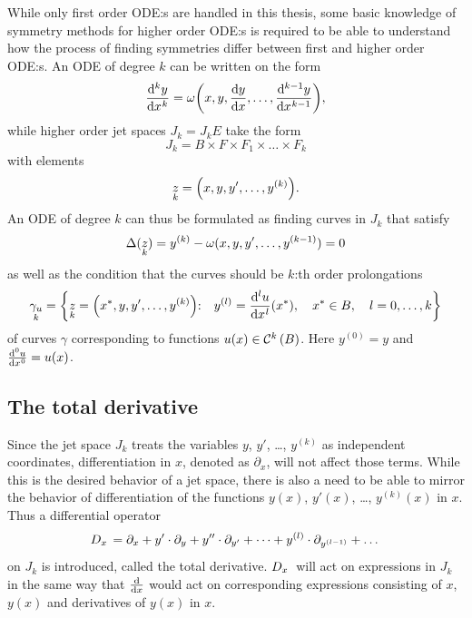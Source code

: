While only first order ODE:s are handled in this thesis, some basic knowledge of symmetry methods for higher order ODE:s is required to be able to understand how the process of finding symmetries differ between first and higher order ODE:s.
An ODE of degree \(k\) can be written on the form
\begin{equation}
  \diff[k]{y}{x} = \omega\qty(x, y, \diff{y}{x}, \dots, \diff[k-1]{y}{x}),
\end{equation}
while higher order jet spaces \(J_k = J_k E\) take the form
\begin{equation}
  J_k = B \times F \times F_1 \times \dots \times F_k
\end{equation}
with elements
\begin{equation}
  \prolong{z}{k} = \qty(x, y, y', \dots, y^{(k)}).
\end{equation}
An ODE of degree \(k\) can thus be formulated as finding curves in \(J_k\) that satisfy
\begin{equation}
  \Delta(\prolong{z}{k}) = y^{(k)} - \omega(x, y, y', \dots, y^{(k-1)}) = 0
\end{equation}
as well as the condition that the curves should be \(k\):th order prolongations
\begin{equation}
  \prolong{\gamma_u}{k} = \qty{\prolong{z}{k} = \qty(\fixed{x}, y, y', \dots, y^{(k)})\qq*{:} y^{(l)} = \diff[l]{u}{x}{(\fixed{x})}\qc \fixed{x} \in B\qc l = 0, \dots, k}
\end{equation}
of curves \(\gamma\) corresponding to functions \(u(x) \in \cont{k}{B}\).
Here \(y^{(0)} = y\) and \(\diff[0]{u}{x} = u(x)\).

\subsection{The total derivative}

Since the jet space \(J_k\) treats the variables \(y\), \(y'\), \dots, \(y^{(k)}\) as independent coordinates, differentiation in \(x\), denoted as \(\partial_x\), will not affect those terms.
While this is the desired behavior of a jet space, there is also a need to be able to mirror the behavior of differentiation of the functions \(y(x)\), \(y'(x)\), \dots, \(y^{(k)}(x)\) in \(x\).
Thus a differential operator
\begin{equation}
  \tD{x} = \partial_x + y' \cdot \partial_y + y'' \cdot \partial_{y'} + \dots + y^{(l)} \cdot \partial_{y^{(l-1)}} + \dots
\end{equation}
on \(J_k\) is introduced, called the total derivative.
\(\tD{x}\) will act on expressions in \(J_k\) in the same way that \(\diff*{}{x}\) would act on corresponding expressions consisting of \(x\), \(y(x)\) and derivatives of \(y(x)\) in \(x\).

